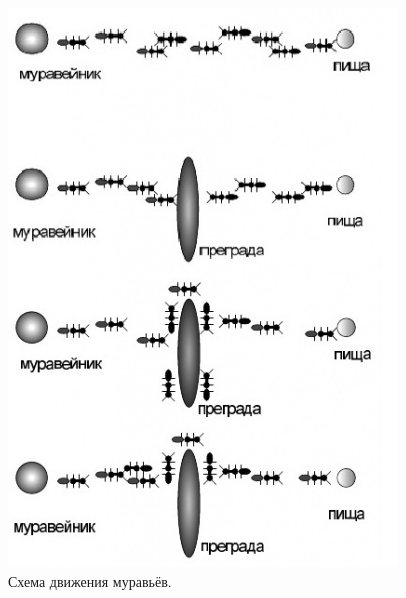 \documentclass[a4paper,oneside,14pt]{extreport}
\begin{document}
\begin{figure}[H]
	\begin{center}
		\includegraphics[scale=0.6]{images/pic_way.png}
		\caption{Схема движения муравьёв.}
		\label{fig:pic_way}
	\end{center}
\end{figure}
\end{document}
